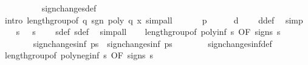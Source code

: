 \begin{isabellebody}
\ \ \ \ \ \ \ \ \isamarkupfalse%
\ sign{\isacharunderscore}changes{\isacharunderscore}def\isanewline
\ \ \ \ \ \ \ \ \isamarkupfalse%
\ {\isacharparenleft}intro\ length{\isacharunderscore}group{\isacharbrackleft}of\ {\isachardoublequoteopen}{\isasymlambda}q{\isachardot}\ sgn\ {\isacharparenleft}poly\ q\ x{\isacharparenright}{\isachardoublequoteclose}{\isacharbrackright}{\isacharcomma}\ simp{\isacharunderscore}all{\isacharparenright}\isanewline
\ \ \isacommand{{\isacharbraceright}}\isamarkupfalse%
\isanewline
\isanewline
\ \ \isamarkupfalse%
\ {\isachardoublequoteopen}p\ {\isasymnoteq}\ {}{\isachardoublequoteclose}\isanewline
\ \ \isamarkupfalse%
\ {\isachardoublequoteopen}d\ {\isasymnoteq}\ {}{\isachardoublequoteclose}\ \isamarkupfalse%
\ d{\isacharunderscore}def\ \isamarkupfalse%
\ simp\isanewline
\ \ \isamarkupfalse%
\ {\isachardoublequoteopen}s{\isacharprime}\ {\isasymnoteq}\ {}{\isachardoublequoteclose}\ {\isachardoublequoteopen}s{\isacharprime}{\isacharprime}\ {\isasymnoteq}\ {}{\isachardoublequoteclose}\ \isamarkupfalse%
\ s{\isacharprime}{\isacharunderscore}def\ s{\isacharprime}{\isacharprime}{\isacharunderscore}def\ \isamarkupfalse%
\ simp{\isacharunderscore}all\isanewline
\ \ \isamarkupfalse%
\ length{\isacharunderscore}group{\isacharbrackleft}of\ poly{\isacharunderscore}inf\ s{\isacharprime}{\isacharcomma}\ OF\ signs{\isacharparenleft}{}{\isacharparenright}\ {\isacharbackquoteopen}s{\isacharprime}\ {\isasymnoteq}\ {}{\isacharbackquoteclose}{\isacharbrackright}\isanewline
\ \ \ \ \ \ \isamarkupfalse%
\ {\isachardoublequoteopen}sign{\isacharunderscore}changes{\isacharunderscore}inf\ ps{\isacharprime}\ {\isacharequal}\ sign{\isacharunderscore}changes{\isacharunderscore}inf\ ps{\isachardoublequoteclose}\isanewline
\ \ \ \ \ \ \isamarkupfalse%
\ sign{\isacharunderscore}changes{\isacharunderscore}inf{\isacharunderscore}def\ \isacommand{{\isachardot}}\isamarkupfalse%
\isanewline
\ \ \isamarkupfalse%
\ length{\isacharunderscore}group{\isacharbrackleft}of\ poly{\isacharunderscore}neg{\isacharunderscore}inf\ s{\isacharprime}{\isacharprime}{\isacharcomma}\ OF\ signs{\isacharparenleft}{}{\isacharparenright}\ {\isacharbackquoteopen}s{\isacharprime}{\isacharprime}\ {\isasymnoteq}\ {}{\isacharbackquoteclose}{\isacharbrackright}\isanewline

\end{isabellebody}
